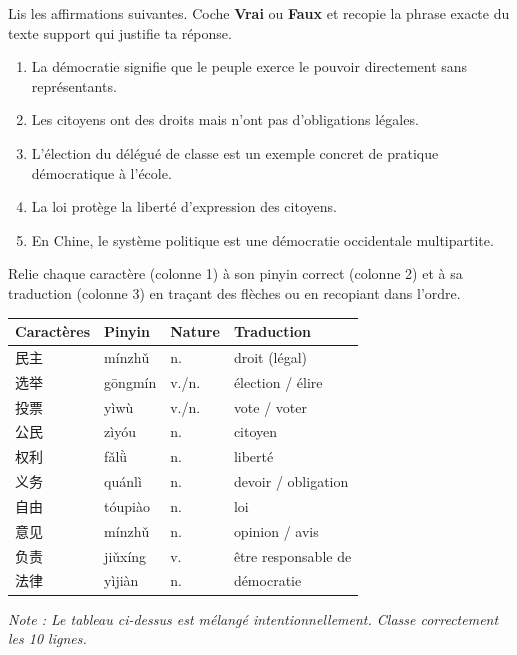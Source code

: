 \documentclass[11pt]{article}
\begin{document}
\begin{exercice}
Lis les affirmations suivantes. Coche \textbf{Vrai} ou \textbf{Faux} et recopie la phrase exacte du texte support qui justifie ta réponse.
\begin{enumerate}
    \item La démocratie signifie que le peuple exerce le pouvoir directement sans représentants.
    \item Les citoyens ont des droits mais n'ont pas d'obligations légales.
    \item L'élection du délégué de classe est un exemple concret de pratique démocratique à l'école.
    \item La loi protège la liberté d'expression des citoyens.
    \item En Chine, le système politique est une démocratie occidentale multipartite.
\end{enumerate}
\end{exercice}

\begin{exercice}
Relie chaque caractère (colonne 1) à son pinyin correct (colonne 2) et à sa traduction (colonne 3) en traçant des flèches ou en recopiant dans l'ordre.
\begin{center}
\begin{tabularx}{\linewidth}{|X|X|X|X|}
\hline
\rowcolor{popblueL} \textbf{Caractères} & \textbf{Pinyin} & \textbf{Nature} & \textbf{Traduction} \\ \hline
民主 & mínzhǔ & n. & droit (légal) \\ \hline
选举 & gōngmín & v./n. & élection / élire \\ \hline
投票 & yìwù & v./n. & vote / voter \\ \hline
公民 & zìyóu & n. & citoyen \\ \hline
权利 & fǎlǜ & n. & liberté \\ \hline
义务 & quánlì & n. & devoir / obligation \\ \hline
自由 & tóupiào & n. & loi \\ \hline
意见 & mínzhǔ & n. & opinion / avis \\ \hline
负责 & jiǔxíng & v. & être responsable de \\ \hline
法律 & yìjiàn & n. & démocratie \\ \hline
\end{tabularx}
\end{center}
\emph{Note : Le tableau ci-dessus est mélangé intentionnellement. Classe correctement les 10 lignes.}
\end{exercice}
\end{document}
